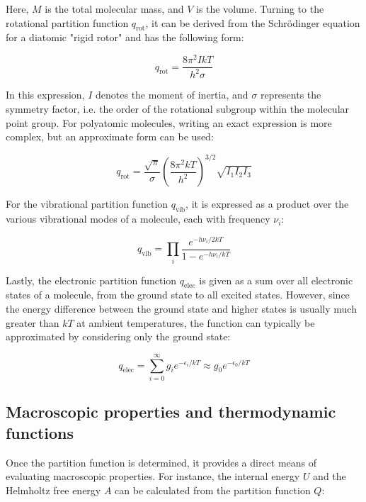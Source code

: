 Here, $M$ is the total molecular mass, and $V$ is the volume. Turning to the rotational partition function $q_\text{rot}$, it can be derived from the Schr\"odinger equation for a diatomic "rigid rotor" and has the following form:

\begin{equation}
    q_{\text{rot}} = \frac{8\pi^2IkT}{h^2\sigma}
\end{equation}

In this expression, $I$ denotes the moment of inertia, and $\sigma$ represents the symmetry factor, i.e. the order of the rotational subgroup within the molecular point group. For polyatomic molecules, writing an exact expression is more complex, but an approximate form can be used:

\begin{equation}
    q_{\text{rot}} = \frac{\sqrt{\pi}}{\sigma}\left(\frac{8\pi^2kT}{h^2}\right)^{3/2} \sqrt{I_1I_2I_3}
\end{equation}

For the vibrational partition function $q_\text{vib}$, it is expressed as a product over the various vibrational modes of a molecule, each with frequency $\nu_i$:

\begin{equation}
    q_{\text{vib}} = \prod_{i} \frac{e^{-h\nu_i/2kT}}{1-e^{-h\nu_i/kT}}
\end{equation}

Lastly, the electronic partition function $q_\text{elec}$ is given as a sum over all electronic states of a molecule, from the ground state to all excited states. However, since the energy difference between the ground state and higher states is usually much greater than $kT$ at ambient temperatures, the function can typically be approximated by considering only the ground state:

\begin{equation}
    q_{\text{elec}} = \sum_{i=0}^{\infty} g_i e^{-\epsilon_i/kT} \approx g_0 e^{-\epsilon_0/kT}
\end{equation} 



\subsection{Macroscopic properties and thermodynamic functions}

Once the partition function is determined, it provides a direct means of evaluating macroscopic properties. For instance, the internal energy $U$ and the Helmholtz free energy $A$ can be calculated from the partition function $Q$:

